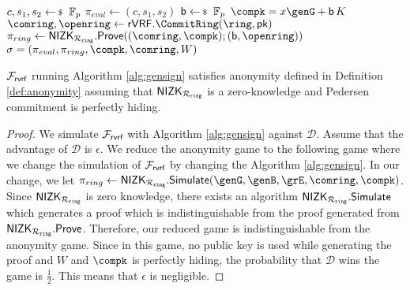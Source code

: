 \begin{algorithm}
	
	\caption{$\gen_{sign}(\ring,W,\{X,\pk\},\aux,\msg)$}
	\label{alg:gensign}	 	
	\begin{algorithmic}[1]
		\State $ c,s_1, s_2 \leftsample \FF_p $
		\State $ \pi_{eval}  \leftarrow (c,s_1, s_2)$
		\State $ \openpk \leftsample \FF_p $
		\State $ \compk =  x \genG + \openpk \, K$
		\State $ \comring, \openring \leftarrow \rVRF.\CommitRing(\ring, \pk) $
		\State $ \pi_{ring} \leftarrow \NIZK_{\rsnark}.\Prove((\comring, \compk); (\openpk, \openring)) $ 
		\State\Return$ \sigma = (\pi_{eval},\pi_{ring},\compk,\comring,W) $
	\end{algorithmic}
	
\end{algorithm}


\begin{lemma} \label{lem:anonymity} $ \mathcal{F}_{\textsf{rvrf}} $ running Algorithm \ref{alg:gensign} satisfies anonymity defined in Definition \ref{def:anonymity} assuming that $ {\mathsf{NIZK}}_{\mathcal{R}_{\mathtt{ring}}} $ is a zero-knowledge and Pedersen commitment is perfectly hiding.
\end{lemma}

\begin{proof}
	We simulate $ \mathcal{F}_{\textsf{rvrf}} $ with Algorithm \ref{alg:gensign} against $ \mathcal{D} $. Assume that the advantage of $ \mathcal{D} $ is $ \epsilon $. We reduce the anonymity game to the following game where we change the simulation of $ \mathcal{F}_{\textsf{rvrf}} $ by changing the Algorithm \ref{alg:gensign}. In our change, we let $ \pi_{ring} \leftarrow \NIZK_{\rsnark}.\mathsf{Simulate}(\genG,\genB,\GG,\comring, \compk) $. Since $ {\mathsf{NIZK}}_{\mathcal{R}_{\mathtt{ring}}} $ is zero knowledge, there exists an algorithm  $ {\mathsf{NIZK}}_{\mathcal{R}_{\mathtt{ring}}}.\mathsf{Simulate} $ which generates a proof which is indistinguishable from the proof generated from $ {\mathsf{NIZK}}_{\mathcal{R}_{\mathtt{ring}}}.{\mathsf{Prove}} $. Therefore, our reduced game is indistinguishable from the anonymity game. Since in this game, no public key is used while generating the proof and $ W $ and $ \compk $ is perfectly hiding, the probability that  $ \mathcal{D} $ wins the game is $ \frac{1}{2} $. This means that $ \epsilon $ is negligible.		
\end{proof}


